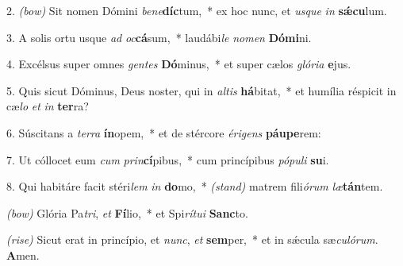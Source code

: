 2. \textit{(bow)} Sit nomen Dómini \textit{be}\textit{ne}\-\textbf{díc}tum,~* ex hoc nunc, et \textit{us}\textit{que} \textit{in} \textbf{s\'{\ae}}\textbf{cu}lum.

3. A solis ortu usque \textit{ad} \textit{oc}\textbf{cá}sum,~* laudábi\textit{le} \textit{no}\textit{men} \textbf{Dó}\textbf{mi}ni.

4. Excélsus super omnes \textit{gen}\textit{tes} \textbf{Dó}minus,~* et super cælos \textit{gló}\textit{ri}\textit{a} \textbf{e}jus.

5. Quis sicut Dóminus, Deus noster, qui in \textit{al}\textit{tis} \textbf{há}bitat,~* et humília réspicit in cæ\textit{lo} \textit{et} \textit{in} \textbf{ter}ra?

6. Súscitans a \textit{ter}\textit{ra} \textbf{ín}opem,~* et de stércore \textit{é}\textit{ri}\textit{gens} \textbf{páu}\textbf{pe}rem:

7. Ut cóllocet eum \textit{cum} \textit{prin}\textbf{cí}pibus,~* cum princípibus \textit{pó}\textit{pu}\textit{li} \textbf{su}i.

8. Qui habitáre facit stéri\textit{lem} \textit{in} \textbf{do}mo,~* {\color{red}\textit{(stand)}} matrem fili\textit{ó}\textit{rum} \textit{læ}\textbf{tán}tem.

{\color{red}\textit{(bow)}} Glória Pa\textit{tri}, \textit{et} \textbf{Fí}lio,~* et Spi\textit{rí}\textit{tu}\textit{i} \textbf{Sanc}to.

{\color{red}\textit{(rise)}} Sicut erat in princípio, et \textit{nunc}, \textit{et} \textbf{sem}per,~* et in s\'{\ae}cula sæ\textit{cu}\textit{ló}\textit{rum}. \textbf{A}men.